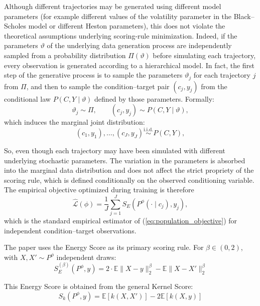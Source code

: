 Although different trajectories may be generated using different model parameters (for example different values of the volatility parameter in the Black--Scholes model or different Heston parameters), this does not violate the theoretical assumptions underlying scoring-rule minimization. Indeed, if the parameters $\vartheta$ of the underlying data generation process are independently 
sampled from a probability distribution $\Pi(\vartheta)$ before simulating each trajectory, every observation is generated according to a hierarchical model. In fact, the first step of the generative process is to sample the parameters $\vartheta_j$ for each trajectory $j$ from $\Pi$, and then to sample the condition--target pair $(c_j,y_j)$ from the conditional law $P(C,Y \mid\vartheta)$ defined by those parameters. Formally:
\[
\vartheta_j\sim\Pi,
\qquad
(c_j,y_j)\sim P(C,Y \mid\vartheta),
\]
which induces the marginal joint distribution:
\[
(c_1,y_1),\ldots,(c_J,y_J)
\stackrel{\mathrm{i.i.d.}}{\sim}
P(C,Y),
\]

So, even though each trajectory may have been simulated with different underlying stochastic parameters. The variation in the parameters is absorbed into the marginal data distribution and does not affect the strict propriety of the scoring rule, which is defined conditionally on the observed conditioning variable.\\




The empirical objective optimized during training is therefore
\begin{equation}
\label{eq:empirical_sr}
\hat{\mathcal{L}}(\phi)
=
\frac{1}{J}
\sum_{j=1}^{J}
S_E\!\left(
P^\phi(\cdot\mid c_j),
y_j
\right),
\end{equation}
which is the standard empirical estimator of (\ref{eq:population_objective}) for independent condition--target observations.





The paper \cite{srforgan:srforgan} uses the Energy Score as its primary scoring rule. 
For $\beta \in (0,2)$, with $X, X' \sim P^\phi$ independent draws:
\begin{equation}
    \label{eq:energy_score}
S_E^{(\beta)}(P^\phi, y) = 2 \cdot \mathbb{E}\|X - y\|_2^\beta - \mathbb{E}\|X - X'\|_2^\beta
\end{equation}

This Energy Score is obtained from the general Kernel Score:
\begin{equation*}
    \label{eq:kernel_score} 
    S_k(P^\phi, y) = \mathbb{E}[k(X,X')] - 2\mathbb{E}[k(X,y)]
\end{equation*}

